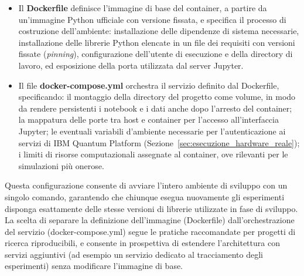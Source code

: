 \begin{itemize}
    \item Il \textbf{Dockerfile} definisce l'immagine di base del container, a partire da un'immagine Python ufficiale con versione fissata, e specifica il processo di costruzione dell'ambiente: installazione delle dipendenze di sistema necessarie, installazione delle librerie Python elencate in un file dei requisiti con versioni fissate (\textit{pinning}), configurazione dell'utente di esecuzione e della directory di lavoro, ed esposizione della porta utilizzata dal server Jupyter.
    \item Il file \textbf{docker-compose.yml} orchestra il servizio definito dal Dockerfile, specificando: il montaggio della directory del progetto come volume, in modo da rendere persistenti i notebook e i dati anche dopo l'arresto del container; la mappatura delle porte tra host e container per l'accesso all'interfaccia Jupyter; le eventuali variabili d'ambiente necessarie per l'autenticazione ai servizi di IBM Quantum Platform (Sezione~\ref{sec:esecuzione_hardware_reale}); i limiti di risorse computazionali assegnate al container, ove rilevanti per le simulazioni più onerose.
\end{itemize}

Questa configurazione consente di avviare l'intero ambiente di sviluppo con un singolo comando, garantendo che chiunque esegua nuovamente gli esperimenti disponga esattamente delle stesse versioni di librerie utilizzate in fase di sviluppo. La scelta di separare la definizione dell'immagine (Dockerfile) dall'orchestrazione del servizio (docker-compose.yml) segue le pratiche raccomandate per progetti di ricerca riproducibili, e consente in prospettiva di estendere l'architettura con servizi aggiuntivi (ad esempio un servizio dedicato al tracciamento degli esperimenti) senza modificare l'immagine di base.

